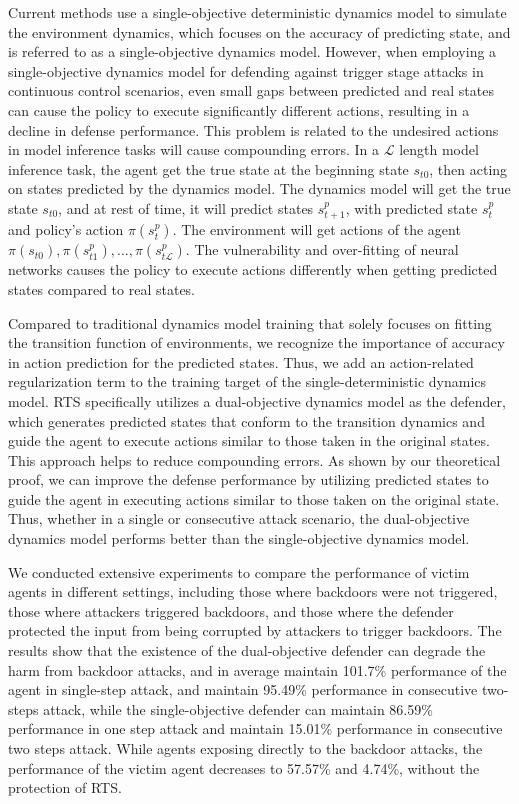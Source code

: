 \documentclass[letterpaper, 10 pt, conference]{ieeeconf}  %
\begin{document}
Current methods use a single-objective deterministic dynamics model to simulate the environment dynamics, which focuses on the accuracy of predicting state, and is referred to as a single-objective dynamics model. However, when employing a single-objective dynamics model for defending against trigger stage attacks in continuous control scenarios, even small gaps between predicted and real states can cause the policy to execute significantly different actions, resulting in a decline in defense performance. This problem is related to the undesired actions in model inference tasks will cause compounding errors. In a $\mathcal{L}$ length model inference task, the agent get the true state at the beginning state $s_{t0}$, then acting on states predicted by the dynamics model. The dynamics model will get the true state $s_{t0}$, and at rest of time, it will predict states $s^p_{t+1}$, with predicted state $s^p_t$ and policy's action $\pi(s^p_t)$. The environment will get actions of the agent $\pi(s_{t0}), \pi(s^p_{t1}),..., \pi(s^p_{t\mathcal{L}})$. The vulnerability and over-fitting of neural networks causes the policy to execute actions differently when getting predicted states compared to real states.

Compared to traditional dynamics model training that solely focuses on fitting the transition function of environments, we recognize the importance of accuracy in action prediction for the predicted states. Thus, we add an action-related regularization term to the training target of the single-deterministic dynamics model. RTS specifically utilizes a dual-objective dynamics model as the defender, which generates predicted states that conform to the transition dynamics and guide the agent to execute actions similar to those taken in the original states. This approach helps to reduce compounding errors. As shown by our theoretical proof, we can improve the defense performance by utilizing predicted states to guide the agent in executing actions similar to those taken on the original state. Thus, whether in a single or consecutive attack scenario, the dual-objective dynamics model performs better than the single-objective dynamics model.

We conducted extensive experiments to compare the performance of victim agents in different settings, including those where backdoors were not triggered, those where attackers triggered backdoors, and those where the defender protected the input from being corrupted by attackers to trigger backdoors. The results show that the existence of the dual-objective defender can degrade the harm from backdoor attacks, and in average maintain 101.7\% performance of the agent in single-step attack, and maintain 95.49\% performance in consecutive two-steps attack, while the single-objective defender can maintain 86.59\% performance in one step attack and maintain 15.01\% performance in consecutive two steps attack. While agents exposing directly to the backdoor attacks, the performance of the victim agent decreases to 57.57\% and 4.74\%, without the protection of RTS.
\end{document}
